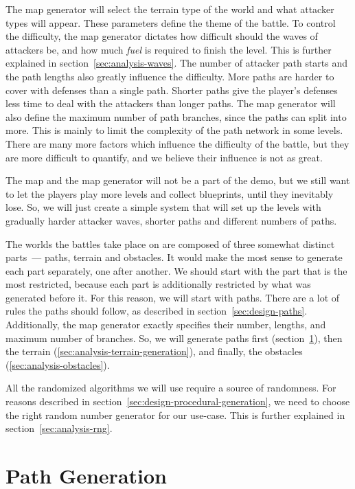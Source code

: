 The map generator will select the terrain type of the world and what attacker types will appear.
These parameters define the theme of the battle.
To control the difficulty, the map generator dictates how difficult should the waves of attackers be, and how much \emph{fuel} is required to finish the level.
This is further explained in section~\ref{sec:analysis-waves}.
The number of attacker path starts and the path lengths also greatly influence the difficulty.
More paths are harder to cover with defenses than a single path.
Shorter paths give the player's defenses less time to deal with the attackers than longer paths.
The map generator will also define the maximum number of path branches, since the paths can split into more.
This is mainly to limit the complexity of the path network in some levels.
There are many more factors which influence the difficulty of the battle, but they are more difficult to quantify, and we believe their influence is not as great.

The map and the map generator will not be a part of the demo, but we still want to let the players play more levels and collect blueprints, until they inevitably lose.
So, we will just create a simple system that will set up the levels with gradually harder attacker waves, shorter paths and different numbers of paths.

The worlds the battles take place on are composed of three somewhat distinct parts~--- paths, terrain and obstacles.
It would make the most sense to generate each part separately, one after another.
We should start with the part that is the most restricted, because each part is additionally restricted by what was generated before it.
For this reason, we will start with paths.
There are a lot of rules the paths should follow, as described in section~\ref{sec:design-paths}.
Additionally, the map generator exactly specifies their number, lengths, and maximum number of branches.
So, we will generate paths first (section~\ref{sec:analysis-path-generation}), then the terrain (\ref{sec:analysis-terrain-generation}), and finally, the obstacles (\ref{sec:analysis-obstacles}).

All the randomized algorithms we will use require a source of randomness.
For reasons described in section~\ref{sec:design-procedural-generation}, we need to choose the right random number generator for our use-case.
This is further explained in section~\ref{sec:analysis-rng}.

\section{Path Generation}\label{sec:analysis-path-generation}

